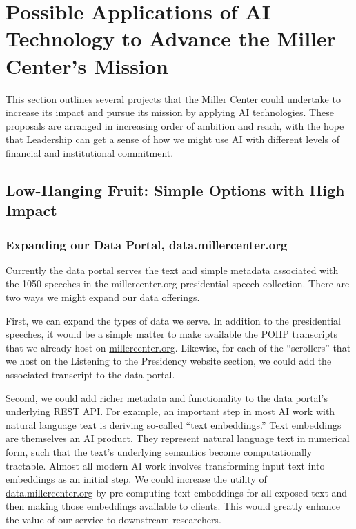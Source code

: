 \documentclass[12pt, oneside]{article}   	%
\begin{document}
\section{Possible Applications of AI Technology to Advance the Miller Center's Mission}\label{section.applications}
This section outlines several projects that the Miller Center could undertake to increase its impact and pursue its mission by applying AI technologies.  These proposals are arranged in increasing order of ambition and reach, with the hope that Leadership can get a sense of how we might use AI with different levels of financial and institutional commitment.  

\subsection{Low-Hanging Fruit: Simple Options with High Impact}\label{section.applications.easy}

\subsubsection{Expanding our Data Portal, data.millercenter.org}\label{section.applications.easy.data-portal}
Currently the data portal serves the text and simple metadata associated with the 1050 speeches in the millercenter.org presidential speech collection.   There are two ways we might expand our data offerings.  

First, we can expand the types of data we serve.  In addition to the presidential speeches, it would be a simple matter to make available the POHP transcripts that we already host on \url{millercenter.org}.  Likewise, for each of the “scrollers” that we host on the Listening to the Presidency website section, we could add the associated transcript to the data portal.  

Second, we could add richer metadata and functionality to the data portal’s underlying REST API.  For example, an important step in most AI work with natural language text is deriving so-called “text embeddings.”  Text embeddings are themselves an AI product.  They represent natural language text in numerical form, such that the text’s underlying semantics become computationally tractable.  Almost all modern AI work involves transforming input text into embeddings as an initial step.  We could increase the utility of \url{data.millercenter.org} by pre-computing text embeddings for all exposed text and then making those embeddings available to clients.  This would greatly enhance the value of our service to downstream researchers.
\end{document}
